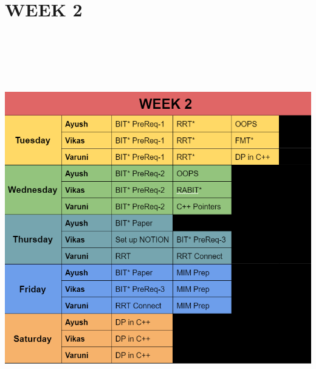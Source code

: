 \documentclass[12pt]{report}
\begin{document}
\section{WEEK 2}
\includegraphics[height=17cm,width = 15cm]{week2.png}
\end{document}
